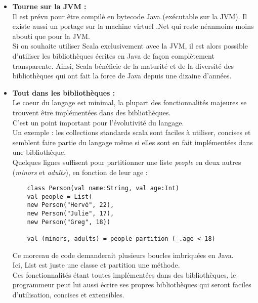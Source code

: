 \begin{itemize}
\item[\textbullet]\textbf{Tourne sur la JVM :}\\
  Il est prévu pour être compilé en bytecode Java (exécutable sur la JVM).
  Il existe aussi un portage sur la machine virtuel .Net qui reste néanmoins
  moins abouti que pour la JVM.\\

  Si on souhaite utiliser Scala exclusivement avec la JVM, il est alors possible
  d'utiliser les bibliothèques écrites en Java de façon complètement
  transparente. Ainsi, Scala bénéficie de la maturité et de la diversité des
  bibliothèques qui ont fait la force de Java depuis une dizaine d'années.\\

\item[\textbullet]\textbf{Tout dans les bibliothèques :}\\
  Le coeur du langage est minimal, la plupart des fonctionnalités majeures se
  trouvent être implémentées dans des bibliothèques.\\
  C'est un point important pour l'évolutivité du langage.\\

  Un exemple : les collections standards scala sont faciles à utiliser, concises
  et semblent faire partie du langage même si elles sont en fait implémentées
  dans une bibliothèque.\\
  Quelques lignes suffisent pour partitionner une liste \textit{people} en deux
  autres (\textit{minors} et \textit{adults}), en fonction de leur age :
\begin{verbatim}
    class Person(val name:String, val age:Int)
    val people = List(
    new Person("Hervé", 22),
    new Person("Julie", 17),
    new Person("Greg", 18))

    val (minors, adults) = people partition (_.age < 18)
\end{verbatim}
Ce morceau de code demanderait plusieurs boucles imbriquées en Java.\\
Ici, List est juste une classe et partition une méthode.\\
Ces fonctionnalités étant toutes implémentées dans des bibliothèques,
le programmeur peut lui aussi écrire ses propres bibliothèques qui seront
faciles d'utilisation, concises et extensibles.\\


\end{itemize}
